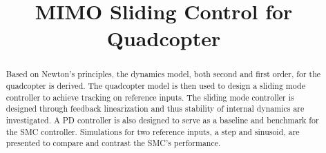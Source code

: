 \documentclass[conference]{IEEEtran}
\begin{document}
%
\title{MIMO Sliding Control for Quadcopter}


\author{
}


\maketitle


\begin{abstract}
Based on Newton's principles, the dynamics model, both second and first order, for the quadcopter is derived. The quadcopter model is then used to design a sliding mode controller to achieve tracking on reference inputs. The sliding mode controller is designed through feedback linearization and thus stability of internal dynamics are investigated. A PD controller is also designed to serve as a baseline and benchmark for the SMC controller. Simulations for two reference inputs, a step and sinusoid, are presented to compare and contrast the SMC's performance.
\end{abstract}





%
\IEEEpeerreviewmaketitle
\end{document}
